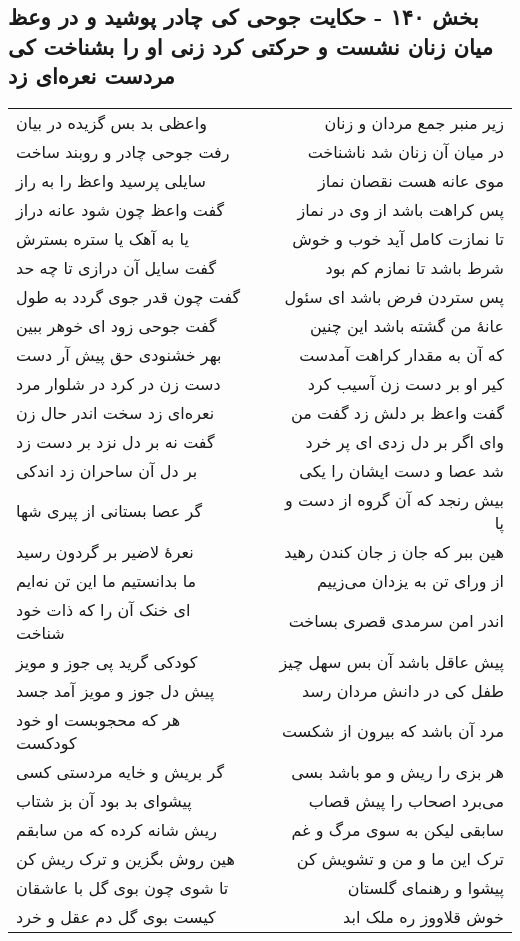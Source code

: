 \begin{center}
\section*{بخش ۱۴۰ - حکایت جوحی کی چادر پوشید و در وعظ میان زنان نشست  و حرکتی کرد زنی او را بشناخت کی مردست نعره‌ای زد}
\label{sec:sh140}
\begin{longtable}{l p{0.5cm} r}
واعظی بد بس گزیده در بیان
&&
زیر منبر جمع مردان و زنان
\\
رفت جوحی چادر و روبند ساخت
&&
در میان آن زنان شد ناشناخت
\\
سایلی پرسید واعظ را به راز
&&
موی عانه هست نقصان نماز
\\
گفت واعظ چون شود عانه دراز
&&
پس کراهت باشد از وی در نماز
\\
یا به آهک یا ستره بسترش
&&
تا نمازت کامل آید خوب و خوش
\\
گفت سایل آن درازی تا چه حد
&&
شرط باشد تا نمازم کم بود
\\
گفت چون قدر جوی گردد به طول
&&
پس ستردن فرض باشد ای سئول
\\
گفت جوحی زود ای خوهر ببین
&&
عانهٔ من گشته باشد این چنین
\\
بهر خشنودی حق پیش آر دست
&&
که آن به مقدار کراهت آمدست
\\
دست زن در کرد در شلوار مرد
&&
کیر او بر دست زن آسیب کرد
\\
نعره‌ای زد سخت اندر حال زن
&&
گفت واعظ بر دلش زد گفت من
\\
گفت نه بر دل نزد بر دست زد
&&
وای اگر بر دل زدی ای پر خرد
\\
بر دل آن ساحران زد اندکی
&&
شد عصا و دست ایشان را یکی
\\
گر عصا بستانی از پیری شها
&&
بیش رنجد که آن گروه از دست و پا
\\
نعرهٔ لاضیر بر گردون رسید
&&
هین ببر که جان ز جان کندن رهید
\\
ما بدانستیم ما این تن نه‌ایم
&&
از ورای تن به یزدان می‌زییم
\\
ای خنک آن را که ذات خود شناخت
&&
اندر امن سرمدی قصری بساخت
\\
کودکی گرید پی جوز و مویز
&&
پیش عاقل باشد آن بس سهل چیز
\\
پیش دل جوز و مویز آمد جسد
&&
طفل کی در دانش مردان رسد
\\
هر که محجوبست او خود کودکست
&&
مرد آن باشد که بیرون از شکست
\\
گر بریش و خایه مردستی کسی
&&
هر بزی را ریش و مو باشد بسی
\\
پیشوای بد بود آن بز شتاب
&&
می‌برد اصحاب را پیش قصاب
\\
ریش شانه کرده که من سابقم
&&
سابقی لیکن به سوی مرگ و غم
\\
هین روش بگزین و ترک ریش کن
&&
ترک این ما و من و تشویش کن
\\
تا شوی چون بوی گل با عاشقان
&&
پیشوا و رهنمای گلستان
\\
کیست بوی گل دم عقل و خرد
&&
خوش قلاووز ره ملک ابد
\\
\end{longtable}
\end{center}
